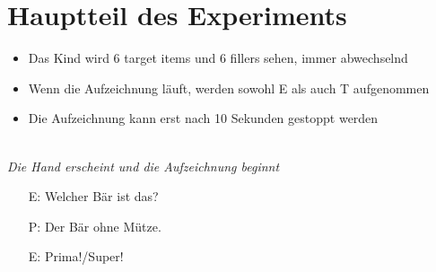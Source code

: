 \documentclass[11pt, oneside]{article}   	%
\begin{document}

\section{Hauptteil des Experiments}

\begin{itemize}
\item Das Kind wird 6 target items und 6 fillers sehen, immer abwechselnd
\item Wenn die Aufzeichnung l\"auft, werden sowohl E als auch T aufgenommen 
\item Die Aufzeichnung kann erst nach 10 Sekunden gestoppt werden
\end{itemize}

\\
{\it Die Hand erscheint und die Aufzeichnung beginnt} 

\vspace{1em}
\begin{itemize}
\item [E:] Welcher B\"{a}r ist das?
\item [P:] Der B\"ar ohne M\"utze.
\item [E:] Prima!/Super!
\end{itemize}


\end{document}
